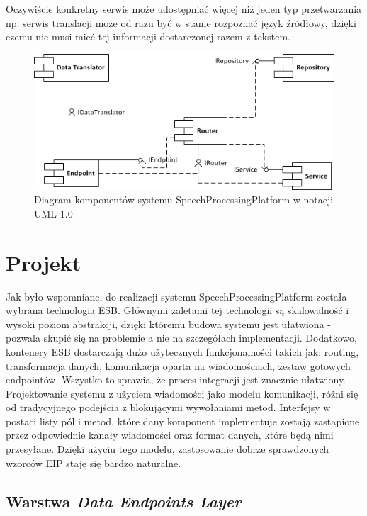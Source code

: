 Oczywiście konkretny serwis może udostępniać więcej niż jeden typ przetwarzania np. serwis translacji może od razu być w stanie rozpoznać język źródłowy, dzięki czemu nie musi mieć tej informacji dostarczonej razem z tekstem.

\begin{figure}[!h]
	\centering
	\includegraphics[scale=1.0]{component_uml.png}
	\caption{Diagram komponentów systemu SpeechProcessingPlatform w notacji UML 1.0}\label{fig:component_diagram}
\end{figure}

\section{Projekt}

Jak było wspomniane, do realizacji systemu SpeechProcessingPlatform została wybrana technologia ESB. Głównymi zaletami tej technologii są skalowalność i wysoki poziom abstrakcji, dzięki któremu budowa systemu jest ułatwiona - pozwala skupić się na problemie a nie na szczegółach implementacji. Dodatkowo, kontenery ESB dostarczają dużo użytecznych funkcjonalności takich jak: routing, transformacja danych, komunikacja oparta na wiadomościach, zestaw gotowych endpointów. Wszystko to sprawia, że proces integracji jest znacznie ułatwiony. Projektowanie systemu z użyciem wiadomości jako modelu komunikacji, różni się od tradycyjnego podejścia z blokującymi wywołaniami metod. Interfejsy w postaci listy pól i metod, które dany komponent implementuje zostają zastąpione przez odpowiednie kanały wiadomości oraz format danych, które będą nimi przesyłane. Dzięki użyciu tego modelu, zastosowanie dobrze sprawdzonych wzorców EIP staję się bardzo naturalne. 

\subsection{Warstwa \textit{Data Endpoints Layer}}

